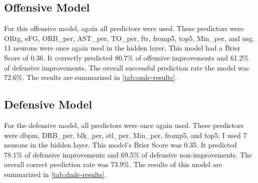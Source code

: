 \documentclass[12pt]{article}
\begin{document}
\subsection{Offensive Model}
\label{subsec:omlc}
For this offensive model, again all predictors were used. These predictors were ORtg, eFG, ORB\_per, AST\_per, TO\_per, ftr, fromp5, top5, Min\_per, and usg. 11 neurons were once again used in the hidden layer. This model had a Brier Score of 0.36. It correctly predicted 80.7\% of offensive improvements and 61.2\% of defensive improvements. The overall successful prediction rate the model was 72.6\%. The results are summarized in \autoref{tab:omlc-results}.

\begin{table}[tbp]
\caption{Offensive Neural Network Classification Model Evaluators}
\centering
{}
\label{tab:omlc-results}
\end{table}

\subsection{Defensive Model}
\label{subsec:dmlc}
For the defensive model, all predictors were once again used. These predictors were dbpm, DRB\_per, blk\_per, stl\_per, Min\_per, fromp5, and top5. I used 7 neurons in the hidden layer. This model's Brier Score was 0.35. It predicted 78.1\% of defensive improvements and 69.5\% of defensive non-improvements. The overall correct prediction rate was 73.9\%. The results of this model are summarized in \autoref{tab:dmlc-results}. 

\begin{table}[tbp]
\caption{Defensive Neural Network Classification Model Evaluators}
\centering
{}
\label{tab:dmlc-results}
\end{table}
\end{document}
